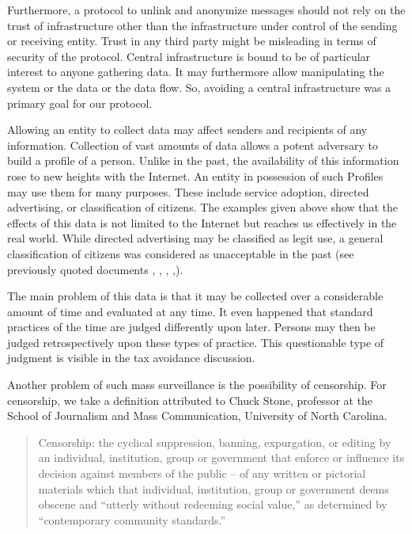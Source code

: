 \documentclass[10pt,journal,compsoc,twocolumn,twoside]{IEEEtran}
\begin{document}
Furthermore, a protocol to unlink and anonymize messages should not rely on the trust of infrastructure other than the infrastructure under control of the sending or receiving entity. Trust in any third party might be misleading in terms of security of the protocol. Central infrastructure is bound to be of particular interest to anyone gathering data. It may furthermore allow manipulating the system or the data or the data flow. So, avoiding a central infrastructure was a primary goal for our protocol.


Allowing an entity to collect data may affect senders and recipients of any information. Collection of vast amounts of data allows a potent adversary to build a  profile of a person. Unlike in the past, the availability of this information rose to new heights with the Internet. An entity in possession of such Profiles may use them for many purposes. These include service adoption, directed advertising, or classification of citizens. The examples given above show that the effects of this data is not limited to the Internet but reaches us effectively in the real world. While directed advertising may be classified as legit use, a general classification of citizens was considered as unacceptable in the past (see previously quoted documents \cite{NCR2013}, \cite{XKeyscore}, \cite{Ball2013}, \cite{Greenberg2013},\cite{Leuenberger1989}).

The main problem of this data is that it may be collected over a considerable amount of time and evaluated at any time. It even happened that standard practices of the time are judged differently upon later. Persons may then be judged retrospectively upon these types of practice. This questionable type of judgment is visible in the tax avoidance discussion\cite{Amat1999}. 

Another problem of such mass surveillance is the possibility of censorship. For censorship, we take a definition attributed to Chuck Stone, professor at the School of Journalism and Mass Communication, University of North Carolina. 
\begin{quote}
	Censorship: the cyclical suppression, banning, expurgation, or editing by an individual, institution, group or government that enforce or influence its decision against members of the public -- of any written or pictorial materials which that individual, institution, group or government deems obscene and ``utterly without redeeming social value,'' as determined by ``contemporary community standards.''
\end{quote}
\end{document}

